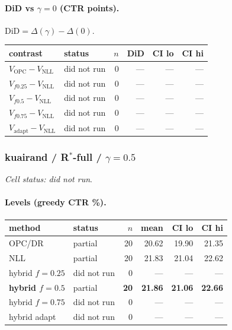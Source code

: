 \documentclass[10pt,a4paper]{article}
\begin{document}
\paragraph{DiD vs $\gamma=0$ (CTR points).} $\mathrm{DiD}=\Delta(\gamma)-\Delta(0)$.
{\centering\small\begin{tabular}{llrrrr}
\toprule contrast & status & $n$ & DiD & CI lo & CI hi \\
\midrule
$V_{\mathrm{OPC}}-V_{\mathrm{NLL}}$ & did not run & 0 & --- & --- & --- \\
$V_{f0.25}-V_{\mathrm{NLL}}$ & did not run & 0 & --- & --- & --- \\
$V_{f0.5}-V_{\mathrm{NLL}}$ & did not run & 0 & --- & --- & --- \\
$V_{f0.75}-V_{\mathrm{NLL}}$ & did not run & 0 & --- & --- & --- \\
$V_{\mathrm{adapt}}-V_{\mathrm{NLL}}$ & did not run & 0 & --- & --- & --- \\
\bottomrule\end{tabular}\par}
\bigskip
\subsubsection{kuairand / R$^*$-full / $\gamma=0.5$}
\emph{Cell status: did not run}.
\paragraph{Levels (greedy CTR \%).}
{\centering\small\begin{tabular}{llrrrr}
\toprule method & status & $n$ & mean & CI lo & CI hi \\
\midrule
OPC/DR & partial & 20 & 20.62 & 19.90 & 21.35 \\
NLL & partial & 20 & 21.83 & 21.04 & 22.62 \\
hybrid $f{=}0.25$ & did not run & 0 & --- & --- & --- \\
\textbf{hybrid $f{=}0.5$} & partial & \textbf{20} & \textbf{21.86} & \textbf{21.06} & \textbf{22.66} \\
hybrid $f{=}0.75$ & did not run & 0 & --- & --- & --- \\
hybrid adapt & did not run & 0 & --- & --- & --- \\
\bottomrule\end{tabular}\par}
\end{document}

